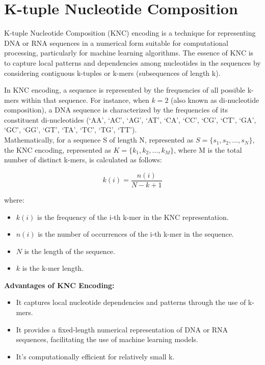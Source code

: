 \section{K-tuple Nucleotide Composition}

K-tuple Nucleotide Composition (KNC) encoding is a technique for representing DNA
or RNA sequences in a numerical form suitable for computational processing,
particularly for machine learning algorithms. The essence of KNC is to capture
local patterns and dependencies among nucleotides in the sequences by considering
contiguous k-tuples or k-mers (subsequences of length k).

In KNC encoding, a sequence is represented by the frequencies of all possible
k-mers within that sequence. For instance, when $k=2$ (also known as di-nucleotide
composition), a DNA sequence is characterized by the frequencies of its constituent
di-nucleotides (`AA', `AC', `AG', `AT', `CA', `CC', `CG', `CT', `GA', `GC', `GG',
`GT', `TA', `TC', `TG', `TT').\\

\noindent
Mathematically, for a sequence S of length N, represented as
$S = \{s_1, s_2, \ldots, s_N\}$, the KNC encoding, represented as
$K = \{k_1, k_2, \ldots, k_M\}$, where M is the total number
of distinct k-mers, is calculated as follows:

\begin{equation}
  k(i) = \frac{n(i)}{N - k + 1}
\end{equation}

\noindent
where:
\begin{itemize}
  \item $k(i)$ is the frequency of the i-th k-mer in the KNC representation.
  \item $n(i)$ is the number of occurrences of the i-th k-mer in the sequence.
  \item $N$ is the length of the sequence.
  \item $k$ is the k-mer length.
\end{itemize}

\noindent
\textbf{Advantages of KNC Encoding:}
\begin{itemize}
  \item It captures local nucleotide dependencies and patterns through the use of k-mers.
  \item It provides a fixed-length numerical representation of DNA or RNA sequences, facilitating the use of machine learning models.
  \item It's computationally efficient for relatively small k.
\end{itemize}

